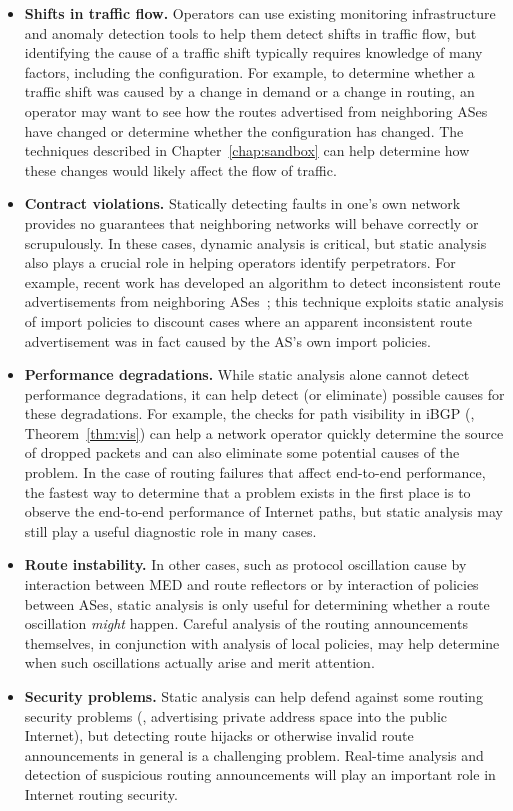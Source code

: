 \begin{itemize}
\itemsep=-1pt
\item {\bf Shifts in traffic flow.}  Operators can use existing
monitoring infrastructure and anomaly detection tools to help them
detect shifts in traffic flow, but identifying the cause of a traffic
shift typically requires knowledge of many factors, including the
configuration.  For example, to determine whether a traffic shift was
caused by a change in demand or a change in routing, an operator may
want to see how the routes advertised from neighboring ASes have
changed or determine whether the configuration has changed.
The techniques described in Chapter~\ref{chap:sandbox} can help determine
how these changes would likely affect the flow of traffic.
%
\item {\bf Contract violations.}  Statically detecting faults in one's own
network provides no guarantees that neighboring networks will behave
correctly or scrupulously.  In these cases, dynamic analysis is
critical, but static 
analysis also plays a crucial role in helping operators identify
perpetrators. For example, recent work has developed an algorithm to
detect inconsistent route advertisements from neighboring
ASes~\cite{Feamster2004b}; this technique exploits static 
analysis of import policies to discount cases where an apparent
inconsistent route advertisement was in fact caused by the AS's own
import policies.
%
\item {\bf Performance degradations.}  While
static analysis alone cannot detect performance degradations, it can
help detect (or eliminate) possible causes for these degradations.  For
example, the checks for path visibility in iBGP (\eg,
Theorem~\ref{thm:vis}) can help a network 
operator quickly determine the source of dropped packets and can also
eliminate some potential causes of the problem.  In the case of routing
failures that affect end-to-end performance, the fastest way to
determine that a problem exists in 
the first place is to observe the end-to-end performance of Internet
paths, but static analysis may still play a useful diagnostic role in
many cases.

\item {\bf Route instability.}
In other cases, such as protocol oscillation cause by interaction between
MED and route reflectors or by interaction of policies between ASes,
static analysis is only useful for determining whether a route
oscillation {\em might} happen.  Careful analysis of the routing
announcements themselves, in conjunction with analysis of local policies,
may help determine when such oscillations actually arise and merit
attention. 
%
\item {\bf Security problems.}  Static analysis can help defend against
some routing security problems (\eg, advertising private address space
into the public Internet), but detecting route hijacks or otherwise
invalid route announcements in general is a challenging problem.  
Real-time analysis and detection of suspicious routing
announcements will play an important role in Internet routing security.
\end{itemize}

